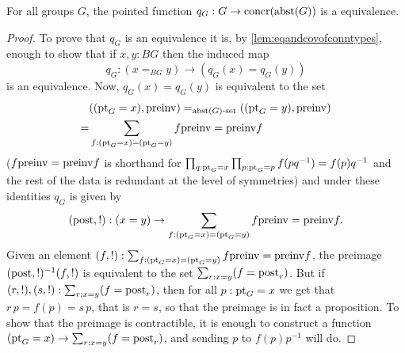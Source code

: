 \begin{lemma}
  \label{lem:Groupsareidentitytypes}%
For all groups $G$, the pointed function $q_G:G\to\mathrm{concr}(\mathrm{abst}(G))$ 
is a  equivalence.
\end{lemma}
\begin{proof}
  To prove that $q_G$ is an equivalence it is, by \cref{lem:eqandcovofconntypes}, enough to show that if $x,y:BG$ then the induced map
$$q_G:(x=_{BG}y)\to (q_G(x)=q_G(y))%
$$
is an equivalence.
  Now, $q_G(x)=q_G(y)$ is equivalent to the set 
\begin{align*}
  &(({\mathord{\mathrm{pt}}}_G=x),\mathrm{preinv})=_{\mathrm{abst}(G)\text{-set}}(({\mathord{\mathrm{pt}}}_G=y),\mathrm{preinv})\\
=&\sum_{f:({\mathord{\mathrm{pt}}}_G=x)=({\mathord{\mathrm{pt}}}_G=y)}f\mathrm{preinv}=\mathrm{preinv} f
\end{align*}
 ($f\mathrm{preinv}=\mathrm{preinv} f$ is shorthand for $\prod_{q:{\mathord{\mathrm{pt}}}_G=x}\prod_{p:{\mathord{\mathrm{pt}}}_G=p}f(pq^{-1})=f(p)q^{-1}$ and the rest of the data is redundant at the level of symmetries) and under these identities $q_G$ is given by 
$$(\mathrm{post},!):(x=y)\to \sum_{f:({\mathord{\mathrm{pt}}}_G=x)=({\mathord{\mathrm{pt}}}_G=y)}f\mathrm{preinv}=\mathrm{preinv} f.$$
Given an element
$(f,!):\sum_{f:({\mathord{\mathrm{pt}}}_G=x)=({\mathord{\mathrm{pt}}}_G=y)}f\mathrm{preinv}=\mathrm{preinv} f$, the preimage 
$(\mathrm{post},!)^{-1}(f,!)$ is equivalent to the set
$\sum_{r:x=y}(f=\mathrm{post}_r)$.  But if $(r,!),(s,!): \sum_{r:x=y}(f=\mathrm{post}_r)$, then for all $p:{\mathord{\mathrm{pt}}}_G=x$ we get that $r\,p=f(p)=s\,p$, that is $r=s$, so that the preimage is in fact a proposition.  
To show that the preimage is contractible, it is enough to construct a function $({\mathord{\mathrm{pt}}}_G=x)\to \sum_{r:x=y}(f=\mathrm{post}_r)$, and sending $p$ to $f(p)p^{-1}$ will do.
\end{proof}


